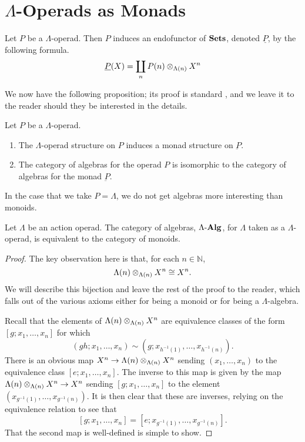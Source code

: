 \section{\texorpdfstring{$\Lambda$}{L}-Operads as Monads}

\begin{Defi}
Let $P$ be a $\Lambda$-operad. Then $P$ induces an endofunctor of $\mathbf{Sets}$, denoted $\underline{P}$, by the following formula.
  \[
	 \underline{P}(X) = \coprod_n P(n) \otimes_{\Lambda(n)} X^{n}
  \]
\end{Defi}

We now have the following proposition; its proof is standard \cite{maygeom}, and we leave it to the reader should they be interested in the details.

\begin{prop}\label{op=monad1}  Let $P$ be a $\Lambda$-operad.
  \begin{enumerate}
    \item The $\Lambda$-operad structure on $P$ induces a monad structure on $\underbar{P}$.
    \item The category of algebras for the operad $P$ is isomorphic to the category of algebras for the monad $\underbar{P}$.
  \end{enumerate}
\end{prop}

In the case that we take $P = \Lambda$, we do not get algebras more interesting than monoids.
\begin{prop}
Let $\Lambda$ be an action operad. The category of algebras, $\Lambda\mbox{-}\mathbf{Alg}$, for $\Lambda$ taken as a $\Lambda$-operad, is equivalent to the category of monoids.
\end{prop}
\begin{proof}
The key observation here is that, for each $n \in \mathbb{N}$,
	\[
		\Lambda(n) \otimes_{\Lambda(n)} X^{n} \cong X^n.
	\]
We will describe this bijection and leave the rest of the proof to the reader, which falls out of the various axioms either for being a monoid or for being a $\Lambda$-algebra.

Recall that the elements of $\Lambda(n) \otimes_{\Lambda(n)} X^{n}$ are equivalence classes of the form $[g ; x_1, \ldots, x_n]$ for which
	\[
		(gh; x_1, \ldots, x_n) \sim \left(g; x_{h^{-1}(1)}, \ldots, x_{h^{-1}(n)}\right).
	\]
There is an obvious map $X^n \rightarrow \Lambda(n) \otimes_{\Lambda(n)} X^{n}$ sending $(x_1, \ldots, x_n)$ to the equivalence class $[e; x_1, \ldots, x_n]$. The inverse to this map is given by the map $\Lambda(n) \otimes_{\Lambda(n)} X^{n} \rightarrow X^n$ sending $[g;x_1,\ldots,x_n]$ to the element $(x_{g^{-1}(1)},\ldots,x_{g^{-1}(n)})$. It is then clear that these are inverses, relying on the equivalence relation to see that
	\[
		[g;x_1,\ldots,x_n] = \left[e;x_{g^{-1}(1)},\ldots,x_{g^{-1}(n)}\right].
	\]
That the second map is well-defined is simple to show.
\end{proof}

